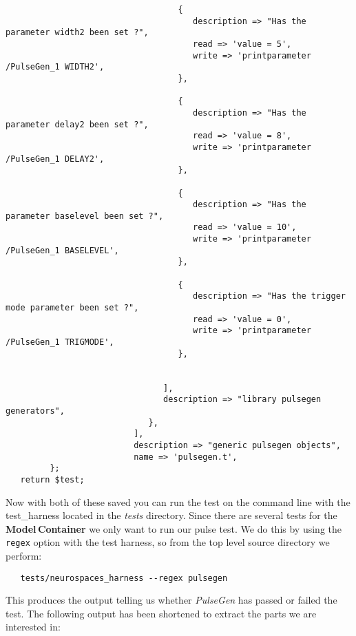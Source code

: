 \documentclass[12pt]{article}
\begin{document}
\begin{verbatim}
                                   {
                                      description => "Has the parameter width2 been set ?",
                                      read => 'value = 5',
                                      write => 'printparameter /PulseGen_1 WIDTH2',
                                   },

                                   {
                                      description => "Has the parameter delay2 been set ?",
                                      read => 'value = 8',
                                      write => 'printparameter /PulseGen_1 DELAY2',
                                   },

                                   {
                                      description => "Has the parameter baselevel been set ?",
                                      read => 'value = 10',
                                      write => 'printparameter /PulseGen_1 BASELEVEL',
                                   },

                                   {
                                      description => "Has the trigger mode parameter been set ?",
                                      read => 'value = 0',
                                      write => 'printparameter /PulseGen_1 TRIGMODE',
                                   },


                                ],
                                description => "library pulsegen generators",
                             },
                          ],
                          description => "generic pulsegen objects",
                          name => 'pulsegen.t',
         };
   return $test;
\end{verbatim}
Now with both of these saved you can run the test on the command line with the test\_harness located in the {\it tests} directory. Since there are several tests for the {\bf Model\,Container} we only want to run our pulse test. We do this by using the {\tt regex} option with the test harness, so from the top level source directory we perform:
\begin{verbatim}
   tests/neurospaces_harness --regex pulsegen
\end{verbatim}
This produces the output telling us whether {\it PulseGen} has passed or failed the test. The following output has been shortened to extract the parts we are interested in:
\end{document}
